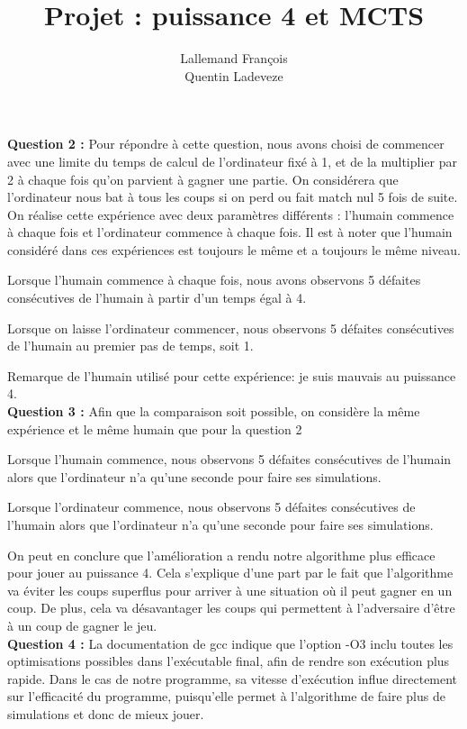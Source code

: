 \documentclass[a4paper, 11pt]{article}
\title{Projet : puissance 4 et MCTS}
\author{Lallemand François\\Quentin Ladeveze}
\begin{document}
\maketitle

\textbf{Question 2 : } Pour répondre à cette question, nous avons choisi de commencer avec une limite du temps de calcul de l'ordinateur fixé à 1, et de la multiplier par 2 à chaque fois qu'on parvient à gagner une partie. On considérera que l'ordinateur nous bat à tous les coups si on perd ou fait match nul 5 fois de suite. On réalise cette expérience avec deux paramètres différents : l'humain commence à chaque fois et l'ordinateur commence à chaque fois. Il est à noter que l'humain considéré dans ces expériences est toujours le même et a toujours le même niveau.

Lorsque l'humain commence à chaque fois, nous avons observons 5 défaites consécutives de l'humain à partir d'un temps égal à 4.

Lorsque on laisse l'ordinateur commencer, nous observons 5 défaites consécutives de l'humain au premier pas de temps, soit 1.

Remarque de l'humain utilisé pour cette expérience: je suis mauvais au puissance 4.\\

\textbf{Question 3 : } Afin que la comparaison soit possible, on considère la même expérience et le même humain que pour la question 2

Lorsque l'humain commence, nous observons 5 défaites consécutives de l'humain alors que l'ordinateur n'a qu'une seconde pour faire ses simulations.

Lorsque l'ordinateur commence, nous observons 5 défaites consécutives de l'humain alors que l'ordinateur n'a qu'une seconde pour faire ses simulations.

On peut en conclure que l'amélioration a rendu notre algorithme plus efficace pour jouer au puissance 4. Cela s'explique d'une part par le fait que l'algorithme va éviter les coups superflus pour arriver à une situation où il peut gagner en un coup. De plus, cela va désavantager les coups qui permettent à l'adversaire d'être à un coup de gagner le jeu.\\

\textbf{Question 4 : } La documentation de gcc indique que l'option -O3 inclu toutes les optimisations possibles dans l'exécutable final, afin de rendre son exécution plus rapide. Dans le cas de notre programme, sa vitesse d'exécution influe directement sur l'efficacité du programme, puisqu'elle permet à l'algorithme de faire plus de simulations et donc de mieux jouer.
\end{document}
